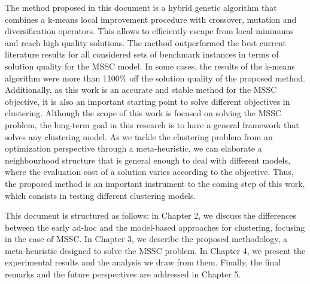 The method proposed in this document is a hybrid genetic algorithm that combines a k-means local improvement procedure with crossover, mutation and diversification operators. This allows to efficiently escape from local minimums and reach high quality solutions. The method outperformed the best current literature results for all considered sets of benchmark instances in terms of solution quality for the MSSC model. In some cases, the results of the k-means algorithm were more than 1100\% off the solution quality of the proposed method. Additionally, as this work is an accurate and stable method for the MSSC objective, it is also an important starting point to solve different objectives in clustering. Although the scope of this work is focused on solving the MSSC problem, the long-term goal in this research is to have a general framework that solves any clustering model. As we tackle the clustering problem from an optimization perspective through a meta-heuristic, we can elaborate a neighbourhood structure that is general enough to deal with different models, where the evaluation cost of a solution varies according to the objective. Thus, the proposed method is an important instrument to the coming step of this work, which consists in testing different clustering models.

This document is structured as follows: in Chapter 2, we discuss the differences between the early ad-hoc and the model-based approaches for clustering, focusing in the case of MSSC. In Chapter 3, we describe the proposed methodology, a meta-heuristic designed to solve the MSSC problem. In Chapter 4, we present the experimental results and the analysis we draw from them. Finally, the final remarks and the future perspectives are addressed in Chapter 5.